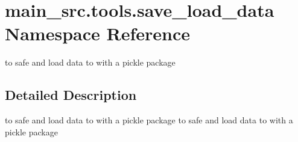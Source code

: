 \hypertarget{namespacemain__src_1_1tools_1_1save__load__data}{\section{main\-\_\-src.\-tools.\-save\-\_\-load\-\_\-data Namespace Reference}
\label{namespacemain__src_1_1tools_1_1save__load__data}
}


to safe and load data to with a pickle package  




\subsection{Detailed Description}
to safe and load data to with a pickle package to safe and load data to with a pickle package 